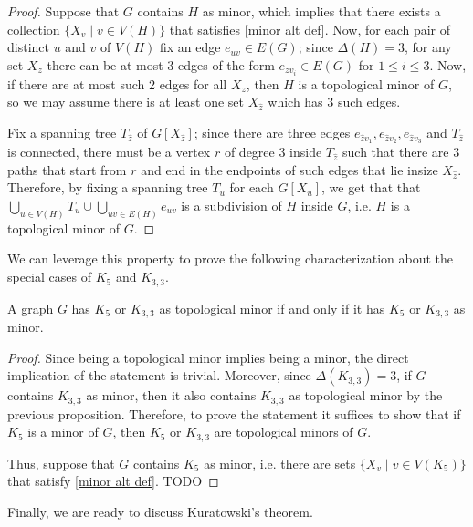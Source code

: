 \documentclass[a4paper, 12pt]{report}
\begin{document}
    \begin{proof}
        Suppose that $G$ contains $H$ as minor, which implies that there exists a collection $\{X_v \mid v \in V(H)\}$ that satisfies \cref{minor alt def}. Now, for each pair of distinct $u$ and $v$ of $V(H)$ fix an edge $e_{uv} \in E(G)$; since $\Delta(H) = 3$, for any set $X_z$ there can be at most 3 edges of the form $e_{zv_i} \in E(G)$ for $1 \le i \le 3$. Now, if there are at most such 2 edges for all $X_z$, then $H$ is a topological minor of $G$, so we may assume there is at least one set $X_{\hat z}$ which has 3 such edges.
 
        Fix a spanning tree $T_{\hat z}$ of $G[X_{\hat z}]$; since there are three edges $e_{\hat zv_1}, e_{\hat zv_2}, e_{\hat zv_3}$ and $T_{\hat z}$ is connected, there must be a vertex $r$ of degree 3 inside $T_{\hat z}$ such that there are 3 paths that start from $r$ and end in the endpoints of such edges that lie insize $X_{\hat z}$. Therefore, by fixing a spanning tree $T_u$ for each $G[X_u]$, we get that that $\displaystyle \bigcup_{u \in V(H)}{T_u} \cup \bigcup_{uv \in E(H)}{e_{uv}}$ is a subdivision of $H$ inside $G$, i.e. $H$ is a topological minor of $G$.
    \end{proof}

    We can leverage this property to prove the following characterization about the special cases of $K_5$ and $K_{3,3}$.

    \begin{framedlem}{}
        A graph $G$ has $K_5$ or $K_{3,3}$ as topological minor if and only if it has $K_5$ or $K_{3,3}$ as minor.
    \end{framedlem}

    \begin{proof}
        Since being a topological minor implies being a minor, the direct implication of the statement is trivial. Moreover, since $\Delta(K_{3,3}) = 3$, if $G$ contains $K_{3,3}$ as minor, then it also contains $K_{3,3}$ as topological minor by the previous proposition. Therefore, to prove the statement it suffices to show that if $K_5$ is a minor of $G$, then $K_5$ or $K_{3,3}$ are topological minors of $G$.

        Thus, suppose that $G$ contains $K_5$ as minor, i.e. there are sets $\{X_v \mid v \in V(K_5)\}$ that satisfy \cref{minor alt def}. TODO 
    \end{proof}

    Finally, we are ready to discuss Kuratowski's theorem.
\end{document}
